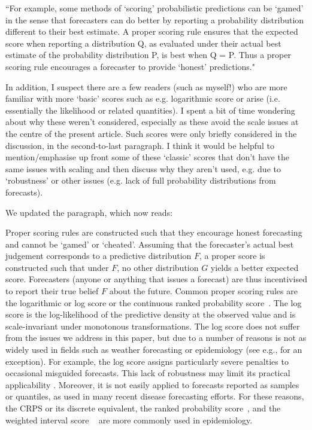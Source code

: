 \documentclass{article}
\newcommand{\black}{\color{black}}
\newcommand{\indented}{\setlength{\leftskip}{1cm}}
\begin{document}
“For example, some methods of ‘scoring’ probabilistic predictions can be ‘gamed’ in the sense that forecasters can do better by reporting a probability distribution different to their best estimate. A proper scoring rule ensures that the expected score when reporting a distribution Q, as evaluated under their actual best estimate of the probability distribution P, is best when Q = P. Thus a proper scoring rule encourages a forecaster to provide ‘honest’ predictions."

In addition, I suspect there are a few readers (such as myself!) who are more familiar with more ‘basic’ scores such as e.g. logarithmic score or arise (i.e. essentially the likelihood or related quantities). I spent a bit of time wondering about why these weren’t considered, especially as these avoid the scale issues at the centre of the present article. Such scores were only briefly considered in the discussion, in the second-to-last paragraph. I think it would be helpful to mention/emphasise up front some of these ‘classic’ scores that don’t have the same issues with scaling and then discuss why they aren’t used, e.g. due to ‘robustness’ or other issues (e.g. lack of full probability distributions from forecasts).

\black
We updated the paragraph, which now reads: 

\indented

Proper scoring rules are constructed such that they encourage honest forecasting and cannot be `gamed' or `cheated'. 
Assuming that the forecaster's actual best judgement corresponds to a predictive distribution $F$, a proper score is constructed such that under $F$, no other distribution $G$ yields a better expected score. Forecasters (anyone or anything that issues a forecast) are thus incentivised to report their true belief $F$ about the future. Common proper scoring rules are the logarithmic or log score \citep{goodRationalDecisions1952} or the continuous ranked probability score~\citep[CRPS,][]{gneitingStrictlyProperScoring2007}. The log score is the log-likelihood of the predictive density at the observed value and is scale-invariant under monotonous transformations. The log score does not suffer from the issues we address in this paper, but due to a number of reasons is not as widely used in fields such as weather forecasting or epidemiology (see e.g., \citealt{Johansson2019} for an exception). For example, the log score assigns particularly severe penalties to occasional misguided forecasts. This lack of robustness may limit its practical applicability \cite{bracherEvaluatingEpidemicForecasts2021}. Moreover, it is not easily applied to forecasts reported as samples or quantiles, as used in many recent disease forecasting efforts. 
For these reasons, the CRPS or its discrete equivalent, the ranked probability score~\citep[RPS,][]{funkAssessingPerformanceRealtime2019}, and the weighted interval score ~\citep[WIS,][]{bracherEvaluatingEpidemicForecasts2021} are more commonly used in epidemiology. 
\end{document}
